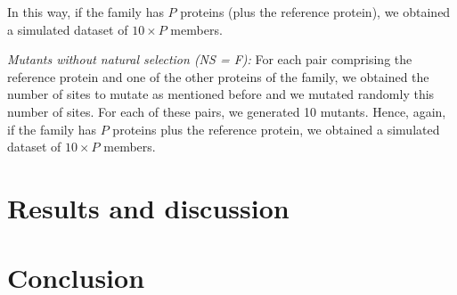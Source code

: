 \documentclass{article}
\begin{document}
In this way, if the family has $P$ proteins (plus the reference protein), we obtained a simulated dataset of $10 \times P$  members. 

{\it Mutants without natural selection (NS = F):} For each pair comprising the reference protein and one of the other proteins of the family, we obtained the number of sites to mutate as mentioned before and we mutated randomly this number of sites. For each of these pairs, we generated 10 mutants. Hence, again, if the family has $P$ proteins plus the reference protein, we obtained a simulated dataset of  $10 \times P$  members.

\section{Results and discussion}

\section{Conclusion}
\end{document}
